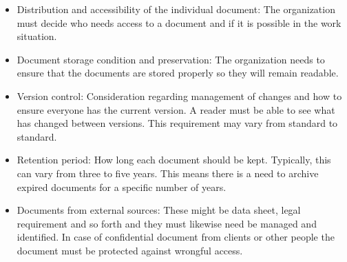 \begin{itemize}
	\item 
	Distribution and accessibility of the individual document: 
	The organization must decide who needs access to a document and if it is possible in the work situation.
	\item 
	Document storage condition and preservation: 
	The organization needs to ensure that the documents are stored properly so they will remain readable. 
	\item 
	Version control: 
	Consideration regarding management of changes and how to ensure everyone has the current version. 
	A reader must be able to see what has changed between versions. 
	This requirement may vary from standard to standard. 
	\item 
	Retention period: 
	How long each document should be kept. 
	Typically, this can vary from three to five years. 
	This means there is a need to archive expired documents for a specific number of years. 
	\item 
	Documents from external sources: 
	These might be data sheet, legal requirement and so forth and they must likewise need be managed and identified. 
	In case of confidential document from clients or other people the document must be protected against wrongful access.
\end{itemize}



